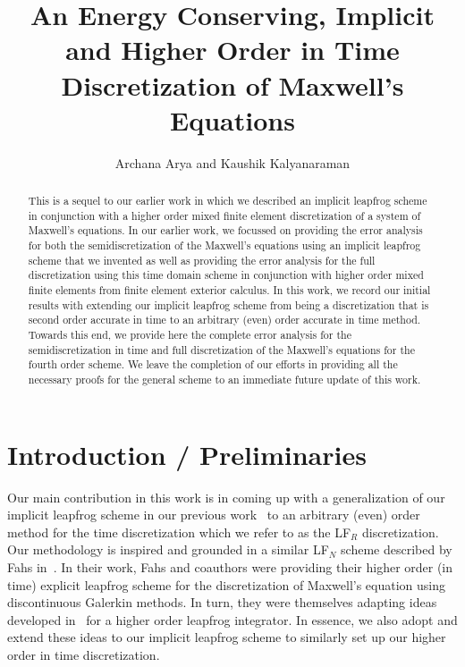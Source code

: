 \documentclass{amsart}
\theoremstyle{thmstyleone}%
\theoremstyle{thmstyletwo}%
\theoremstyle{thmstylethree}%
\begin{document}
\title[Higher Order Implicit Discretization of Maxwell's Equations]{An Energy Conserving, Implicit and Higher Order in Time Discretization of Maxwell's Equations}

\author{Archana Arya and Kaushik Kalyanaraman}
\address{Department of Mathematics, Indraprastha Institute of Information Technology, Delhi, New Delhi, 110020, India}

\begin{abstract}
  This is a sequel to our earlier work in which we described an implicit leapfrog scheme in conjunction with a higher order mixed finite element discretization of a system of Maxwell's equations. In our earlier work, we focussed on providing the error analysis for both the semidiscretization of the Maxwell's equations using an implicit leapfrog scheme that we invented as well as providing the error analysis for the full discretization using this time domain scheme in conjunction with higher order mixed finite elements from finite element exterior calculus. In this work, we record our initial results with extending our implicit leapfrog scheme from being a discretization that is second order accurate in time to an arbitrary (even) order accurate in time method. Towards this end, we provide here the complete error analysis for the semidiscretization in time and full discretization of the Maxwell's equations for the fourth order scheme. We leave the completion of our efforts in providing all the necessary proofs for the general scheme to an immediate future update of this work.
  \end{abstract}



\maketitle


\section{Introduction / Preliminaries} \label{sec:introduction}

Our main contribution in this work is in coming up with a generalization of our implicit leapfrog scheme in our previous work~\cite{ArKa2024} to an arbitrary (even) order method for the time discretization which we refer to as the LF$_R$ discretization. Our methodology is inspired and grounded in a similar LF$_N$ scheme described by Fahs in~\cite{Fahs2008,FaLa2010}. In their work, Fahs and coauthors were providing their higher order (in time) explicit leapfrog scheme for the discretization of Maxwell's equation using discontinuous Galerkin methods. In turn, they were themselves adapting ideas developed in~\cite{Young2001} for a higher order leapfrog integrator. In essence, we also adopt and extend these ideas to our implicit leapfrog scheme to similarly set up our higher order in time discretization.
\end{document}
